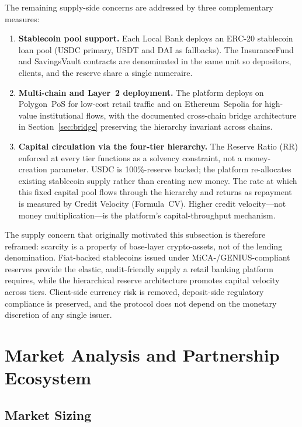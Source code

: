 \documentclass[12pt,a4paper]{report}
\begin{document}
The remaining supply-side concerns are addressed by three complementary measures:

\begin{enumerate}[noitemsep]
\item \textbf{Stablecoin pool support.} Each Local Bank deploys an ERC-20 stablecoin loan pool (USDC primary, USDT and DAI as fallbacks). The InsuranceFund and SavingsVault contracts are denominated in the same unit so depositors, clients, and the reserve share a single numeraire.
\item \textbf{Multi-chain and Layer~2 deployment.} The platform deploys on Polygon~PoS for low-cost retail traffic and on Ethereum~Sepolia for high-value institutional flows, with the documented cross-chain bridge architecture in Section~\ref{sec:bridge} preserving the hierarchy invariant across chains.
\item \textbf{Capital circulation via the four-tier hierarchy.} The Reserve Ratio (RR) enforced at every tier functions as a solvency constraint, not a money-creation parameter. USDC is 100\%-reserve backed; the platform re-allocates existing stablecoin supply rather than creating new money. The rate at which this fixed capital pool flows through the hierarchy and returns as repayment is measured by Credit Velocity (Formula~CV). Higher credit velocity---not money multiplication---is the platform's capital-throughput mechanism.
\end{enumerate}

The supply concern that originally motivated this subsection is therefore reframed: scarcity is a property of base-layer crypto-assets, not of the lending denomination. Fiat-backed stablecoins issued under MiCA-/GENIUS-compliant reserves provide the elastic, audit-friendly supply a retail banking platform requires, while the hierarchical reserve architecture promotes capital velocity across tiers. Client-side currency risk is removed, deposit-side regulatory compliance is preserved, and the protocol does not depend on the monetary discretion of any single issuer.

\section{Market Analysis and Partnership Ecosystem}

\subsection{Market Sizing}
\end{document}
